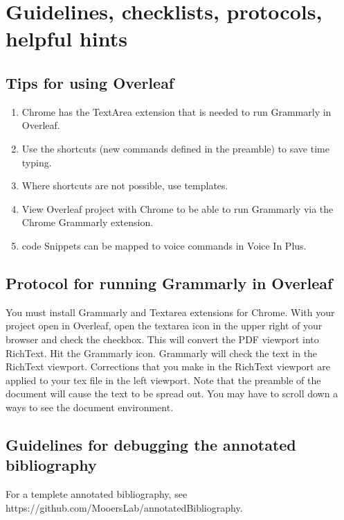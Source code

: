 \documentclass[10pt,letterpaper]{article}
\newcommand{\be}{\begin{enumerate}}
\newcommand{\ee}{\end{enumerate}}
\begin{document}
\section{Guidelines, checklists, protocols, helpful hints}
\label{sec:guides}

\subsection{Tips for using Overleaf}
\label{subsec:guides:overleaf}


\be
\item Chrome has the TextArea extension that is needed to run Grammarly in Overleaf.
\item Use the shortcuts (new commands defined in the preamble) to save time typing.
\item Where shortcuts are not possible, use templates.
\item View Overleaf project with Chrome to be able to run Grammarly via the Chrome Grammarly extension.
\item code Snippets can be mapped to voice commands in Voice In Plus.
\ee 


\subsection{Protocol for running Grammarly in Overleaf}
\label{subsec:guides:grammarlyInoverleaf}

You must install Grammarly and Textarea extensions for Chrome.
With your project open in Overleaf, open the textarea icon in the upper right of your browser and check the checkbox.
This will convert the PDF viewport into RichText. 
Hit the Grammarly icon. 
Grammarly will check the text in the RichText viewport.
Corrections that you make in the RichText viewport are applied to your tex file in the left viewport.
Note that the preamble of the document will cause the text to be spread out.
You may have to scroll down a ways to see the document environment.


\subsection{Guidelines for debugging the annotated bibliography} 
\label{subsec:guides:annotDebug}

For a templete annotated bibliography, see https://github.com/MooersLab/annotatedBibliography.
\end{document}
